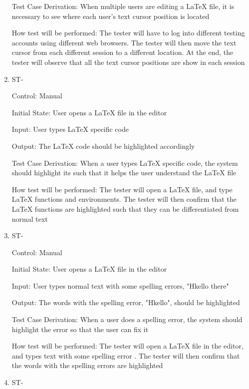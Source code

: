 \documentclass[12pt, titlepage]{article}
\newcounter{TESTID}
\newcommand\TESTNUM{\stepcounter{TESTID}\theTESTID}
\begin{document}
\begin{enumerate}
		Test Case Derivation: When multiple users are editing a LaTeX file, it is necessary to see where each user's text cursor position is located
		
		How test will be performed: The tester will have to log into different testing accounts using different web browsers. The tester will then move the text cursor from each different session to a different location. At the end, the tester will observe that all the text cursor positions are show in each session
		
		\item{ST-\TESTNUM\\}
		
		Control: Manual
		
		Initial State: User opens a LaTeX file in the editor
		
		Input: User types LaTeX specific code
		
		Output: The LaTeX code should be highlighted accordingly
		
		Test Case Derivation: When a user types LaTeX specific code, the system should highlight its such that it helps the user understand the LaTeX file
		
		How test will be performed: The tester will open a LaTeX file, and type LaTeX functions and environments. The tester will then confirm that the LaTeX functions are highlighted such that they can be differentiated from normal text
		
		\item{ST-\TESTNUM\\}
		
		Control: Manual
		
		Initial State: User opens a LaTeX file in the editor
		
		Input: User types normal text with some spelling errors, "Hkello there"
		
		Output: The words with the spelling error, "Hkello", should be highlighted
		
		Test Case Derivation: When a user does a spelling error, the system should highlight the error so that the user can fix it
		
		How test will be performed: The tester will open a LaTeX file in the editor, and types text with some spelling error . The tester will then confirm that the words with the spelling errors are highlighted
		
		\item{ST-\TESTNUM\\}
		

\end{enumerate}
\end{document}
